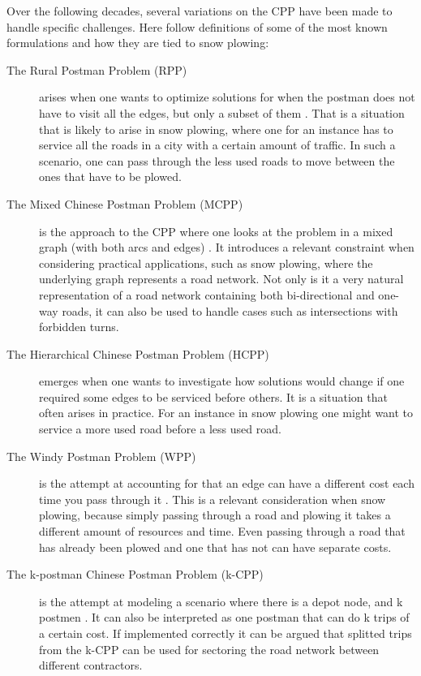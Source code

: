 Over the following decades, several variations on the CPP have been made to handle specific challenges. Here follow definitions of some of the most known formulations and how they are tied to snow plowing:

\begin{description}

\item [The Rural Postman Problem (RPP)] arises when one wants to optimize solutions for when the postman does not have to visit all the edges, but only a subset of them \citep{pearn1995RPP}. That is a situation that is likely to arise in snow plowing, where one for an instance has to service all the roads in a city with a certain amount of traffic. In such a scenario, one can pass through the less used roads to move between the ones that have to be plowed.

\item [The Mixed Chinese Postman Problem (MCPP)] is the approach to the CPP where one looks at the problem in a mixed graph (with both arcs and edges) \citep{pearn1995mixedCPP}. It introduces a relevant constraint when considering practical applications, such as snow plowing, where the underlying graph represents a road network. Not only is it a very natural representation of a road network containing both bi-directional and one-way roads, it can also be used to handle cases such as intersections with forbidden turns.

\item [The Hierarchical Chinese Postman Problem (HCPP)] \citep{ghiani2000HCPP} emerges when one wants to investigate how solutions would change if one required some edges to be serviced before others. It is a situation that often arises in practice. For an instance in snow plowing one might want to service a more used road before a less used road.

\item [The Windy Postman Problem (WPP)] is the attempt at accounting for that an edge can have a different cost each time you pass through it \citep{dussault2013WPP}. This is a relevant consideration when snow plowing, because simply passing through a road and plowing it takes a different amount of resources and time. Even passing through a road that has already been plowed and one that has not can have separate costs.

\item [The k-postman Chinese Postman Problem (k-CPP)] is the attempt at modeling a scenario where there is a depot node, and k postmen \citep{edmonds1973kCPP}. It can also be interpreted as one postman that can do k trips of a certain cost. If implemented correctly it can be argued that splitted trips from the k-CPP can be used for sectoring the road network between different contractors.


\end{description}

